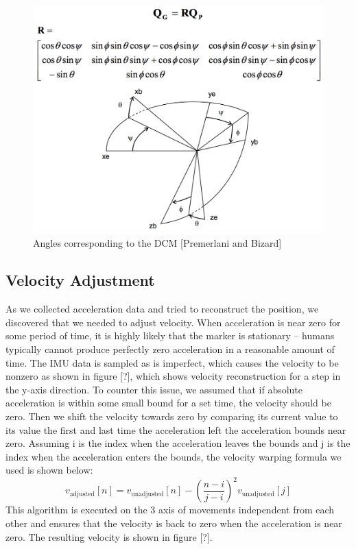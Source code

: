 \documentclass[12pt,journal]{IEEEtran}
\begin{document}
\begin{figure}[h]
  \centering
    \includegraphics[width=\linewidth]{figures/dcm}
  \caption{Angles corresponding to the DCM [Premerlani and Bizard]}
  \label{fig:vel-adjust}
\end{figure}

\subsection{Velocity Adjustment}
	As we collected acceleration data and tried to reconstruct the position, we discovered that we needed to adjust velocity. When acceleration is near zero for some period of time, it is highly likely that the marker is stationary -- humans typically cannot produce perfectly zero acceleration in a reasonable amount of time. The IMU data is sampled as is imperfect, which causes the velocity to be nonzero as shown in figure [?], which shows velocity reconstruction for a step in the y-axis direction.
	To counter this issue, we assumed that if absolute acceleration is within some small bound for a set time, the velocity should be zero. Then we shift the velocity towards zero by comparing its current value to its value the first and last time the acceleration left the acceleration bounds near zero. Assuming i is the index when the acceleration leaves the bounds and j is the index when the acceleration enters the bounds, the velocity warping formula we used is shown below:
$$v_{\text{adjusted}}[n] = v_{\text{unadjusted}}[n] - \left(\frac{n-i}{j-i}\right)^2 v_{\text{unadjusted}}[j]$$
This algorithm is executed on the 3 axis of movements independent from each other and ensures that the velocity is back to zero when the acceleration is near zero. The resulting velocity is shown in figure [?].
\end{document}
